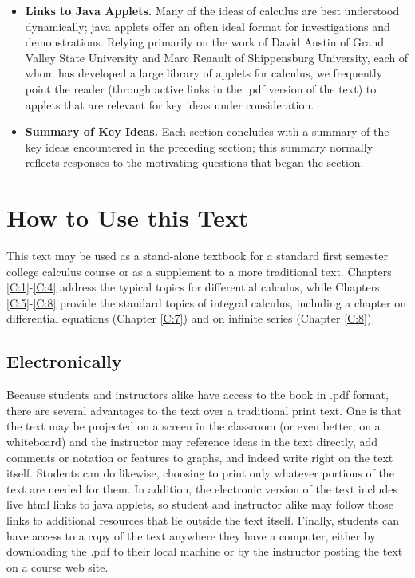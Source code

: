 \begin{itemize}
	\item {\bf Links to Java Applets.}  Many of the ideas of calculus are best understood dynamically; java applets offer an often ideal format for investigations and demonstrations.  Relying primarily on the work of David Austin of Grand Valley State University and Marc Renault of Shippensburg University, each of whom has developed a large library of applets for calculus, we frequently point the reader (through active links in the .pdf version of the text) to applets that are relevant for key ideas under consideration.
	\item {\bf Summary of Key Ideas.}  Each section concludes with a summary of the key ideas encountered in the preceding section; this summary normally reflects responses to the motivating questions that began the section.
\end{itemize}


\section*{How to Use this Text}

This text may be used as a stand-alone textbook for a standard first semester college calculus course or as a supplement to a more traditional text.  Chapters \ref{C:1}-\ref{C:4} address the typical topics for differential calculus, while Chapters \ref{C:5}-\ref{C:8} provide the standard topics of integral calculus, including a chapter on differential equations (Chapter \ref{C:7}) and on infinite series (Chapter \ref{C:8}).

\subsection*{Electronically}

Because students and instructors alike have access to the book in .pdf format, there are several advantages to the text over a traditional print text.  One is that the text may be projected on a screen in the classroom (or even better, on a whiteboard) and the instructor may reference ideas in the text directly, add comments or notation or features to graphs, and indeed write right on the text itself.  Students can do likewise, choosing to print only whatever portions of the text are needed for them.  In addition, the electronic version of the text includes live html links to java applets, so student and instructor alike may follow those links to additional resources that lie outside the text itself.  Finally, students can have access to a copy of the text anywhere they have a computer, either by downloading the .pdf to their local machine or by the instructor posting the text on a course web site.

